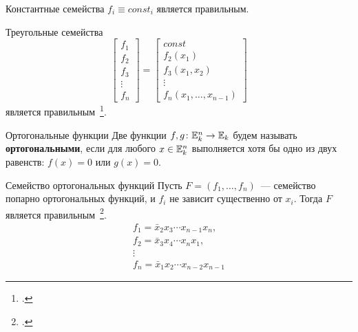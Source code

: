 \begin{frame}%
    \begin{mypropos}{Константные семейства}
        $f_i \equiv const_i$ является правильным.
    \end{mypropos}
    \pause 
    \begin{mypropos}{Треугольные семейства}
        \[
            \begin{bmatrix}
                f_1 \\
                f_2 \\
                f_3 \\
                \vdots \\
                f_n 
            \end{bmatrix}
            =
            \begin{bmatrix}
                const \\
                f_{2}(x_{1}) \\
                f_{3}(x_{1}, x_{2}) \\
                \vdots \\
                f_{n}(x_{1}, \ldots, x_{n-1})
            \end{bmatrix}
        \]
        является правильным~\footcite{nosov06abel}.
    \end{mypropos}
\end{frame}


\begin{frame}%
    \begin{myexample}{Ортогональные функции}
        Две функции $f, g \colon \mathbb{E}_k^n \to \mathbb{E}_k$ будем называть \textbf{ортогональными}, если для любого $x \in \mathbb{E}_k^n$ выполняется хотя бы одно из двух равенств: $f(x) = 0$ или $g(x) = 0$. 
    \end{myexample}
    \pause
    \begin{mypropos}{Семейство ортогональных функций}
        Пусть $F = (f_1, \ldots, f_n)$~--- семейство попарно ортогональных функций, и $f_i$ не зависит существенно от $x_i$.
        Тогда $F$ является правильным~\footcite{nosov08}. 
        \begin{gather*}
            \label{OrthogExample}
            f_1 =\bar{x}_2 x_3 \cdots x_{n-1} x_n,\\
            f_2 =\bar{x}_3 x_4 \cdots x_{n} x_1,\\
            \vdots \\
            f_n =\bar{x}_1 x_2 \cdots x_{n-2} x_{n-1}
        \end{gather*}
    \end{mypropos}
\end{frame}


